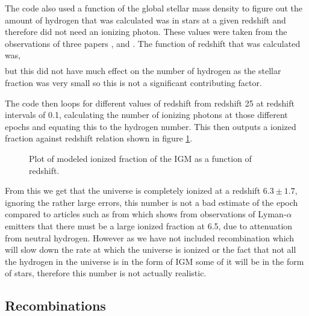 	The code also used a function of the global stellar mass density to figure out the amount of hydrogen that was calculated was in stars at a given redshift and therefore did not need an ionizing photon. These values were taken from the observations of three papers \cite{2006AA...459..745F}, \cite{2003AA...401...73W} and \cite{2003ApJS..149..289B}. The function of redshift that was calculated was,
	\begin{align}

	\end{align}
	but this did not have much effect on the number of hydrogen as the stellar fraction was very small so this is not a significant contributing factor.

	The code then loops for different values of redshift from redshift 25 at redshift intervals of 0.1, calculating the number of ionizing photons at those different epochs and equating this to the hydrogen number. This then outputs a ionized fraction against redshift relation shown in figure \ref{fig:IonizedFraction1}.
	\begin{figure}[!htb]
		\centering
			\begingroup{}
		  		\resizebox{0.7\textwidth}{!}{%
					
		  		}\endgroup
		\caption{Plot of modeled ionized fraction of the IGM as a function of redshift.\label{fig:IonizedFraction1}}
	\end{figure}

	From this we get that the universe is completely ionized at a redshift $6.3\pm1.7$, ignoring the rather large errors, this number is not a bad estimate of the epoch compared to articles such as from \cite{OtaarXiv0707.1561} which shows from observations of Lyman-$\alpha$ emitters that there must be a large ionized fraction at 6.5, due to attenuation from neutral hydrogen. However as we have not included recombination which will slow down the rate at which the universe is ionized or the fact that not all the hydrogen in the universe is in the form of IGM some of it will be in the form of stars, therefore this number is not actually realistic.

\subsection{Recombinations} %
\label{sub:recombinations}

